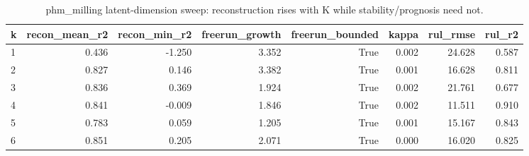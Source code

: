 \begin{table}[t]
\centering
\caption{phm_milling latent-dimension sweep: reconstruction rises with K while stability/prognosis need not.}
\label{tab:phm_milling_ksweep}
\begin{tabular}{lrrrrrrr}
\toprule
k & recon\_mean\_r2 & recon\_min\_r2 & freerun\_growth & freerun\_bounded & kappa & rul\_rmse & rul\_r2 \\
\midrule
1 & 0.436 & -1.250 & 3.352 & True & 0.002 & 24.628 & 0.587 \\
2 & 0.827 & 0.146 & 3.382 & True & 0.001 & 16.628 & 0.811 \\
3 & 0.836 & 0.369 & 1.924 & True & 0.002 & 21.761 & 0.677 \\
4 & 0.841 & -0.009 & 1.846 & True & 0.002 & 11.511 & 0.910 \\
5 & 0.783 & 0.059 & 1.205 & True & 0.001 & 15.167 & 0.843 \\
6 & 0.851 & 0.205 & 2.071 & True & 0.000 & 16.020 & 0.825 \\
\bottomrule
\end{tabular}
\end{table}